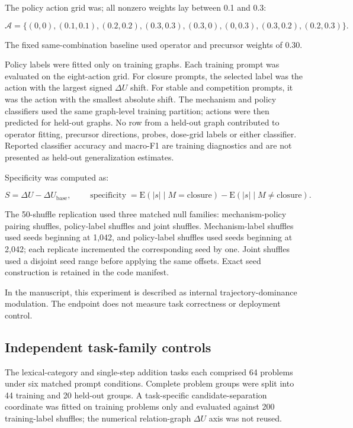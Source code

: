\documentclass[11pt]{article}
\begin{document}
The policy action grid was; all nonzero weights lay between 0.1 and 0.3:

\begin{equation*}
\mathcal{A}=\{(0,0),(0.1,0.1),(0.2,0.2),(0.3,0.3),
(0.3,0),(0,0.3),(0.3,0.2),(0.2,0.3)\}.
\end{equation*}

The fixed same-combination baseline used operator and precursor weights of 0.30.

Policy labels were fitted only on training graphs. Each training prompt was evaluated on the eight-action grid. For closure prompts, the selected label was the action with the largest signed \(\Delta U\) shift. For stable and competition prompts, it was the action with the smallest absolute shift. The mechanism and policy classifiers used the same graph-level training partition; actions were then predicted for held-out graphs. No row from a held-out graph contributed to operator fitting, precursor directions, probes, dose-grid labels or either classifier. Reported classifier accuracy and macro-F1 are training diagnostics and are not presented as held-out generalization estimates.

Specificity was computed as:

\begin{equation*}
S=\Delta U-\Delta U_{\mathrm{base}},\qquad
\operatorname{specificity}=\mathrm{E}(|s|\mid M=\mathrm{closure})
-\mathrm{E}(|s|\mid M\neq\mathrm{closure}).
\end{equation*}

The 50-shuffle replication used three matched null families: mechanism-policy pairing shuffles, policy-label shuffles and joint shuffles. Mechanism-label shuffles used seeds beginning at 1,042, and policy-label shuffles used seeds beginning at 2,042; each replicate incremented the corresponding seed by one. Joint shuffles used a disjoint seed range before applying the same offsets. Exact seed construction is retained in the code manifest.

In the manuscript, this experiment is described as internal trajectory-dominance modulation. The endpoint does not measure task correctness or deployment control.


\subsection*{Independent task-family controls}
The lexical-category and single-step addition tasks each comprised 64 problems under six matched prompt conditions. Complete problem groups were split into 44 training and 20 held-out groups. A task-specific candidate-separation coordinate was fitted on training problems only and evaluated against 200 training-label shuffles; the numerical relation-graph $\Delta U$ axis was not reused.
\end{document}
